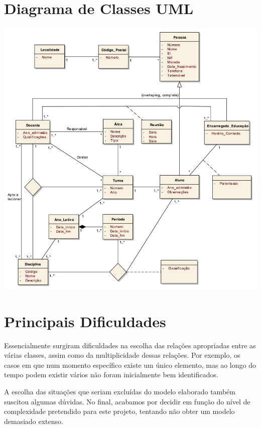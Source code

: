 \documentclass[12pt,a4paper,reqno]{report}
\numberwithin{figure}{section}
\numberwithin{equation}{section}
\begin{document}
\chapter{Diagrama de Classes UML}

\begin{center}

\includegraphics[width=15cm]{UML.jpg}

\end{center}

\chapter{Principais Dificuldades}

Essencialmente surgiram dificuldades na escolha das relações apropriadas entre as várias classes, assim como da multiplicidade dessas relações. Por exemplo, os casos em que num momento específico existe um único elemento, mas ao longo do tempo podem existir vários não foram inicialmente bem identificados.

A escolha das situações que seriam excluídas do modelo elaborado também suscitou algumas dúvidas. No final, acabamos por decidir em função do nível de complexidade pretendido para este projeto, tentando não obter um modelo demasiado extenso.
\end{document}
